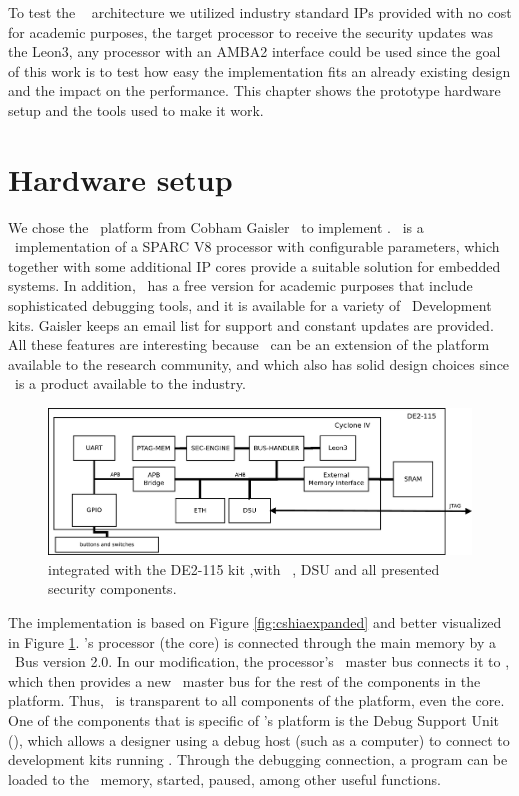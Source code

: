 To test the \cshia~ architecture  we utilized industry standard IPs provided with no cost for academic purposes, the target processor to receive the security updates was the Leon3, any processor with an AMBA2 interface  could be used since the goal of this work is to test how easy the implementation fits an already existing design and  the impact on the performance. This chapter shows the prototype hardware setup and the tools used to make it work.

\section{Hardware setup}
\label{sec:hardware_setup}

We chose the \leon~platform from Cobham Gaisler~\cite{Leon} to implement \cshia. \leon~is a \vhdl~implementation of a SPARC V8 processor with configurable parameters, which together with some additional IP cores provide a suitable solution for embedded systems. In addition, \leon~has a free version for academic purposes that include sophisticated debugging tools, and it is available for a variety of \fpga~Development kits. Gaisler keeps an email list for support and constant updates are provided. All these features are interesting because \cshia~can be an extension of the platform available to the research community, and which also has solid design choices since \leon~is a product available to the industry.

 \begin{figure}[!ht]
    \centering
    \includegraphics[width=1\textwidth]{figures/pdf/leon_amba_new.pdf}
    \caption{\cshia integrated with the DE2-115 kit ,with \leon~, DSU and all presented security components. }
    \label{fig:leoninamba}
\end{figure}

The implementation is based on Figure \ref{fig:cshiaexpanded} and better visualized in Figure \ref{fig:leoninamba}. \leon's processor (the core) is connected through the main memory by a \amba~Bus version 2.0. In our modification, the processor's \io~master bus connects it to \handler, which then provides a new \io~master bus for the rest of the components in the platform. Thus, \handler~is transparent to all components of the platform, even the core. One of the components that is specific of \leon's platform is the Debug Support Unit (\dsu), which allows a designer using a debug host (such as a computer) to connect to development kits running \leon. Through the debugging connection, a program can be loaded to the \fpga~memory, started, paused, among other useful functions.

